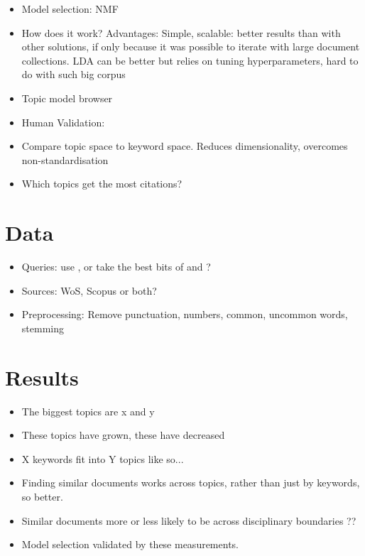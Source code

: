 \documentclass{article}
\begin{document}
\begin{itemize}
\item Model selection: NMF \citep{Lee1999}
\item How does it work? Advantages: Simple, scalable: better results than with other solutions, if only because it was possible to iterate with large document collections. LDA can be better but relies on tuning hyperparameters, hard to do with such big corpus
\item Topic model browser \citet{Chaney2012}
\item Human Validation: 
\item Compare topic space to keyword space. Reduces dimensionality, overcomes non-standardisation
\item Which topics get the most citations?

\end{itemize}

\section{Data}
\begin{itemize}
	\item Queries: use \citet{Grieneisen2011}, or take the best bits of \citet{Grieneisen2011} and \citet{Haunschild2016}?
    \item Sources: WoS, Scopus or both?
    \item Preprocessing: Remove punctuation, numbers, common, uncommon words, stemming
\end{itemize}

\section{Results}
\begin{itemize}
	\item The biggest topics are x and y
	\item These topics have grown, these have decreased
    \item X keywords fit into Y topics like so...
    \item Finding similar documents works across topics, rather than just by keywords, so better.
    \item Similar documents more or less likely to be across disciplinary boundaries ??
    \item Model selection validated by these measurements.
\end{itemize}
\end{document}
